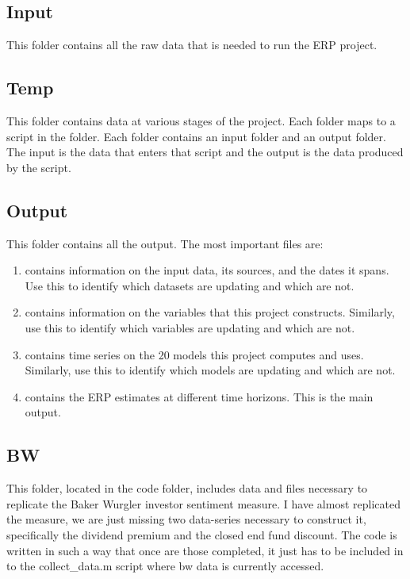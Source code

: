 \documentclass{article}
\begin{document}
	\subsection{Input}
	
	This folder contains all the raw data that is needed to run the ERP project. 
	
	\subsection{Temp}
	
	This folder contains data at various stages of the project. Each folder maps to a script in the  folder. Each folder contains an input folder and an output folder. The input is the data that enters that script and the output is the data produced by the script. 
	
	\subsection{Output}
	
	This folder contains all the output. The most important files are: 
	
	\begin{enumerate}
		\item {} contains information on the input data, its sources, and the dates it spans. Use this to identify which datasets are updating and which are not. 
		\item {} contains information on the variables that this project constructs. Similarly, use this to identify which variables are updating and which are not. 
		\item {} contains time series on the 20 models this project computes and uses. Similarly, use this to identify which models are updating and which are not. 
		\item {} contains the ERP estimates at different time horizons. This is the main output. 
	\end{enumerate}
	
	\subsection{BW}
	
	This folder, located in the code folder, includes data and files necessary to replicate the Baker Wurgler investor sentiment measure. I have almost replicated the measure, we are just missing two data-series necessary to construct it, specifically the dividend premium and the closed end fund discount. The code is written in such a way that once are those completed, it just has to be included in to the collect\_data.m script where bw data is currently accessed. 
	
\end{document}
